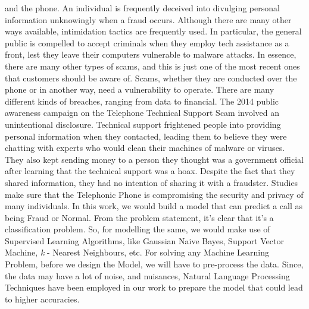 \documentclass[sn-mathphys]{sn-jnl}%
\theoremstyle{thmstyleone}%
\theoremstyle{thmstyletwo}%
\theoremstyle{thmstylethree}%
\begin{document}
and the phone. An individual is frequently deceived into divulging personal information unknowingly when a fraud occurs. Although there are many other ways available, intimidation tactics are frequently used. In particular, the general public is compelled to accept criminals when they employ tech assistance as a front, lest they leave their computers vulnerable to malware attacks. In essence, there are many other types of scams, and this is just one of the most recent ones that customers should be aware of. Scams, whether they are conducted over the phone or in another way, need a vulnerability to operate. There are many different kinds of breaches, ranging from data to financial. The 2014 public awareness campaign on the Telephone Technical Support Scam involved an unintentional disclosure. Technical support frightened people into providing personal information when they contacted, leading them to believe they were chatting with experts who would clean their machines of malware or viruses. They also kept sending money to a person they thought was a government official after learning that the technical support was a hoax. Despite the fact that they shared information, they had no intention of sharing it with a fraudster. Studies make sure that the Telephonic Phone is compromising the security and privacy of many individuals. In this work, we would build a model that can predict a call as being Fraud or Normal. From the problem statement, it's clear that it's a classification problem. So, for modelling the same, we would make use of Supervised Learning Algorithms, like Gaussian Naive Bayes, Support Vector Machine, \textit{k} - Nearest Neighbours, etc. For solving any Machine Learning Problem, before we design the Model, we will have to pre-process the data. Since, the data may have a lot of noise, and nuisances, Natural Language Processing Techniques have been employed in our work to prepare the model that could lead to higher accuracies. 
\end{document}
